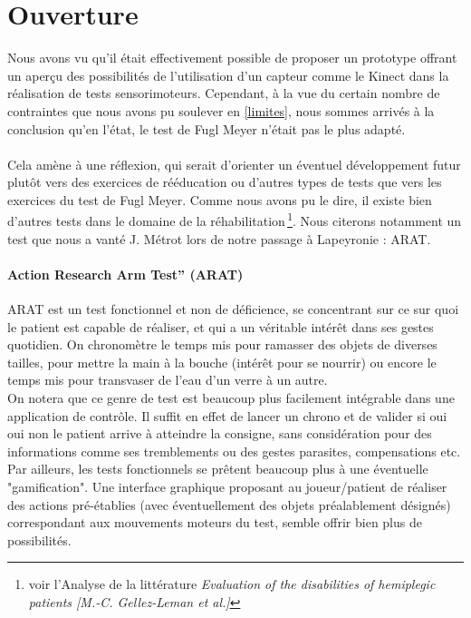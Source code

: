 \documentclass[french,12pt]{report}
\begin{document}
		\section{Ouverture}
Nous avons vu %
 qu'il était effectivement possible de proposer un prototype offrant un aperçu des possibilités de l'utilisation d'un capteur comme le Kinect dans la réalisation de tests sensorimoteurs. Cependant, à la vue du certain nombre de contraintes que nous avons pu soulever en \ref{limites}, nous sommes arrivés à la conclusion qu'en l'état, le test de Fugl Meyer n'était pas le plus adapté. 

\paragraph{}
Cela amène à une réflexion, qui serait d'orienter un éventuel développement futur plutôt vers des exercices de rééducation ou d'autres types de tests que vers les exercices du test de Fugl Meyer. Comme nous avons pu le dire, il existe bien d'autres tests 
dans le domaine de la réhabilitation\,\footnote{voir l'Analyse de la littérature \textit{Evaluation of the disabilities of hemiplegic patients [M.-C. Gellez-Leman et al.]}}. Nous citerons notamment un test que nous a vanté J. Métrot lors de notre passage à 
Lapeyronie : ARAT.
\paragraph{Action Research Arm Test” (ARAT) \\}
ARAT est un test fonctionnel et non de déficience, se concentrant sur ce sur quoi le patient est capable de réaliser, et
qui a un véritable intérêt dans ses gestes quotidien. On chronomètre le temps mis pour ramasser des objets de diverses tailles,
pour mettre la main à la bouche (intérêt pour se nourrir) ou encore le temps mis pour transvaser de l'eau d'un verre à un autre.
\\ On notera que ce genre de test est beaucoup plus facilement intégrable dans une application de contrôle. Il suffit en effet de 
lancer un chrono et de valider si oui oui non le patient arrive à atteindre la consigne, sans considération pour des informations
comme ses tremblements ou des gestes parasites, compensations etc. Par ailleurs, les tests fonctionnels se prêtent beaucoup
plus à une éventuelle "gamification". Une interface graphique proposant au joueur/patient de réaliser des actions pré-établies (avec éventuellement des objets préalablement désignés) correspondant aux mouvements moteurs du test, semble offrir bien
plus de possibilités.
\end{document}

